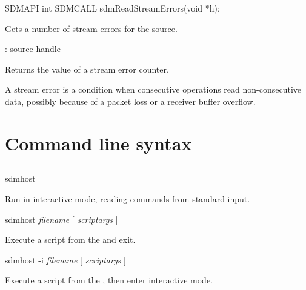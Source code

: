 \documentclass[a4paper,12pt,twoside,extrafontsizes]{memoir}
\begin{document}

\begin{cfuncprototype}
SDMAPI int SDMCALL sdmReadStreamErrors(void *h);
\end{cfuncprototype}

\begin{funcdescr}
	Gets a number of stream errors for the source.
\end{funcdescr}

\begin{funcparams}
	: source handle
\end{funcparams}

\begin{funcret}
	Returns the value of a stream error counter.
\end{funcret}

\begin{funcremarks}
	A stream error is a condition when consecutive operations read non-consecutive data, possibly because of a packet loss or a receiver buffer overflow.
\end{funcremarks}

\appendix

\chapter{Command line syntax}
\label{app:cmdline}

\section[sdmhost]{}

\begin{shellcmds}
sdmhost
\end{shellcmds}

Run  in interactive mode, reading commands from standard input.

\begin{shellcmds}
sdmhost \emph{filename} [ \emph{scriptargs} ]
\end{shellcmds}

Execute a script from the  and exit.

\begin{shellcmds}
sdmhost -i \emph{filename} [ \emph{scriptargs} ]
\end{shellcmds}

Execute a script from the , then enter interactive mode.
\end{document}
